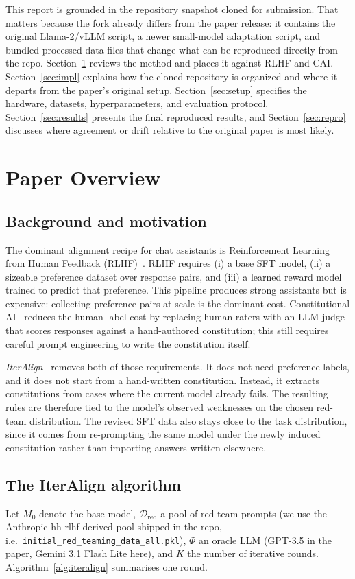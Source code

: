 \documentclass[11pt]{article}
\begin{document}
This report is grounded in the repository snapshot cloned for submission. That matters because the fork already differs from the paper release: it contains the original Llama-2/vLLM script, a newer small-model adaptation script, and bundled processed data files that change what can be reproduced directly from the repo. Section~\ref{sec:paper} reviews the method and places it against RLHF and CAI. Section~\ref{sec:impl} explains how the cloned repository is organized and where it departs from the paper's original setup. Section~\ref{sec:setup} specifies the hardware, datasets, hyperparameters, and evaluation protocol. Section~\ref{sec:results} presents the final reproduced results, and Section~\ref{sec:repro} discusses where agreement or drift relative to the original paper is most likely.

\section{Paper Overview}
\label{sec:paper}

\subsection{Background and motivation}
The dominant alignment recipe for chat assistants is Reinforcement Learning from Human Feedback (RLHF)~\cite{ouyang2022instructgpt}. RLHF requires (i) a base SFT model, (ii) a sizeable preference dataset over response pairs, and (iii) a learned reward model trained to predict that preference. This pipeline produces strong assistants but is expensive: collecting preference pairs at scale is the dominant cost. Constitutional AI~\cite{bai2022cai} reduces the human-label cost by replacing human raters with an LLM judge that scores responses against a hand-authored constitution; this still requires careful prompt engineering to write the constitution itself.

\textit{IterAlign}~\cite{chen2024iteralign} removes both of those requirements. It does not need preference labels, and it does not start from a hand-written constitution. Instead, it extracts constitutions from cases where the current model already fails. The resulting rules are therefore tied to the model's observed weaknesses on the chosen red-team distribution. The revised SFT data also stays close to the task distribution, since it comes from re-prompting the same model under the newly induced constitution rather than importing answers written elsewhere.

\subsection{The IterAlign algorithm}
Let $M_0$ denote the base model, $\mathcal{D}_{\text{red}}$ a pool of red-team prompts (we use the Anthropic hh-rlhf-derived pool shipped in the repo, i.e.\ \texttt{initial\_red\_teaming\_data\_all.pkl}), $\Phi$ an oracle LLM (GPT-3.5 in the paper, Gemini 3.1 Flash Lite here), and $K$ the number of iterative rounds. Algorithm~\ref{alg:iteralign} summarises one round.
\end{document}
